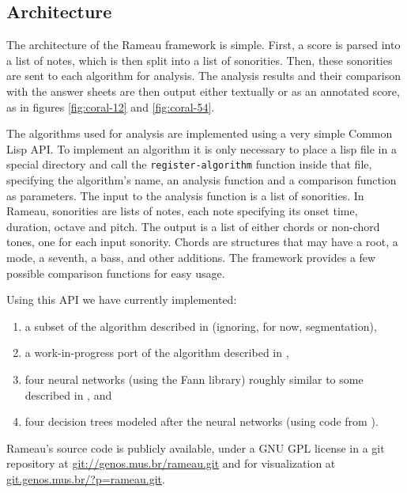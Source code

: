 \documentclass{article}
\begin{document}
\subsection{Architecture}
\label{sec:architecture-and-api}

The architecture of the Rameau framework is simple. First, a score is
parsed into a list of notes, which is then split into a list of
sonorities. Then, these sonorities are sent to each algorithm for
analysis. The analysis results and their comparison with the answer
sheets are then output either textually or as an annotated score, as
in figures \ref{fig:coral-12} and \ref{fig:coral-54}.

The algorithms used for analysis are implemented using a very simple
Common Lisp API. To implement an algorithm it is only necessary to
place a lisp file in a special directory and call the
\texttt{register-algorithm} function inside that file, specifying the
algorithm's name, an analysis function and a comparison function as
parameters. The input to the analysis function is a list of
sonorities. In Rameau, sonorities are lists of notes, each note
specifying its onset time, duration, octave and pitch. The output is a
list of either chords or non-chord tones, one for each input sonority.
Chords are structures that may have a root, a mode, a seventh, a bass,
and other additions. The framework provides a few possible comparison
functions for easy usage.

Using this API we have currently implemented:

\begin{enumerate}
\item a subset of the algorithm described in \cite{pardo.ea:algorithms}
  (ignoring, for now, segmentation), 
\item a work-in-progress port of the algorithm described in
  \cite{temperley.ea:modeling}, 
\item four neural networks (using the Fann \cite{nissen:fann}
  library) roughly similar to some described in
  \cite{tsui:harmonic}, and
\item four decision trees modeled after the neural networks (using code
  from \cite{mitchell:machine}).
\end{enumerate}

Rameau's source code is publicly available, under a GNU GPL
\cite{fsf:gpl} license in a git \cite{baudis:git}
repository at \url{git://genos.mus.br/rameau.git} and for
visualization at \url{git.genos.mus.br/?p=rameau.git}.
\end{document}
